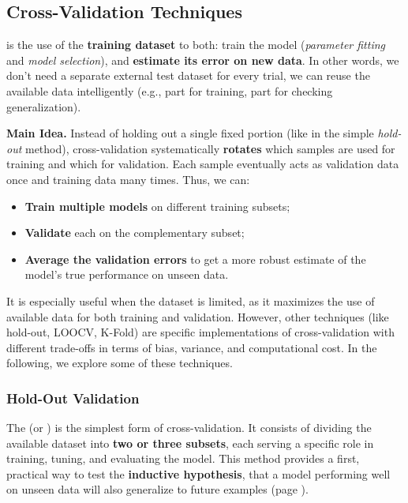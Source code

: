 \subsection{Cross-Validation Techniques}

 is the use of the \textbf{training dataset} to both: train the model (\emph{parameter fitting} and \emph{model selection}), and \textbf{estimate its error on new data}. In other words, we don't need a separate external test dataset for every trial, we can reuse the available data intelligently (e.g., part for training, part for checking generalization).

\highspace
\textcolor{Green3}{ \textbf{Main Idea.}} Instead of holding out a single fixed portion (like in the simple \emph{hold-out} method), cross-validation systematically \textbf{rotates} which samples are used for training and which for validation. Each sample eventually acts as validation data once and training data many times. Thus, we can:
\begin{itemize}
    \item \textbf{Train multiple models} on different training subsets;
    \item \textbf{Validate} each on the complementary subset;
    \item \textbf{Average the validation errors} to get a more robust estimate of the model's true performance on unseen data.
\end{itemize}
It is especially useful when the dataset is limited, as it maximizes the use of available data for both training and validation. However, other techniques (like hold-out, LOOCV, K-Fold) are specific implementations of cross-validation with different trade-offs in terms of bias, variance, and computational cost. In the following, we explore some of these techniques.

\newpage

\subsubsection{Hold-Out Validation}

The  (or ) is the simplest form of cross-validation. It consists of dividing the available dataset into \textbf{two or three subsets}, each serving a specific role in training, tuning, and evaluating the model. This method provides a first, practical way to test the \textbf{inductive hypothesis}, that a model performing well on unseen data will also generalize to future examples (page \pageref{def:inductive-hypothesis}).

